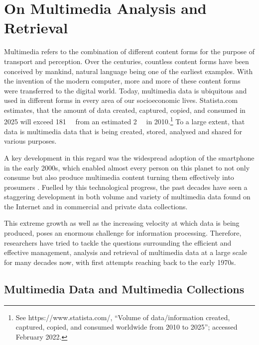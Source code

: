\chapter{On Multimedia Analysis and Retrieval}
\label{chapter:theory_multimedia_analysis_and_retrieval}

Multimedia refers to the combination of different content forms for the purpose of transport and perception. Over the centuries, countless content forms have been conceived by mankind, natural language being one of the earliest examples. With the invention of the modern computer, more and more of these content forms were transferred to the digital world. Today, multimedia data is ubiquitous and used in different forms in every area of our socioeconomic lives. Statista.com estimates, that the amount of data created, captured, copied, and consumed in 2025 will exceed \SI{181}{\zetta\byte} from an estimated \SI{2}{\zetta\byte} in 2010.\footnote{See https://www.statista.com/, ``Volume of data/information created, captured, copied, and consumed worldwide from 2010 to 2025''; accessed February 2022.} To a large extent, that data is multimedia data that is being created, stored, analysed and shared for various purposes.

A key development in this regard was the widespread adoption of the smartphone in the early 2000s, which enabled almost every person on this planet to not only consume but also produce multimedia content turning them effectively into prosumers \cite{Ritzer:2010Production,Ritzer2012:Coming}. Fuelled by this technological progress, the past decades have seen a staggering development in both volume and variety of multimedia data found on the Internet and in commercial and private data collections.

This extreme growth as well as the increasing velocity at which data is being produced, poses an enormous challenge for information processing. Therefore, researchers have tried to tackle the questions surrounding the efficient and effective management, analysis and retrieval of multimedia data at a large scale for many decades now, with first attempts reaching back to the early 1970s.

\section{Multimedia Data and Multimedia Collections}
\label{section:multmedia_data}

